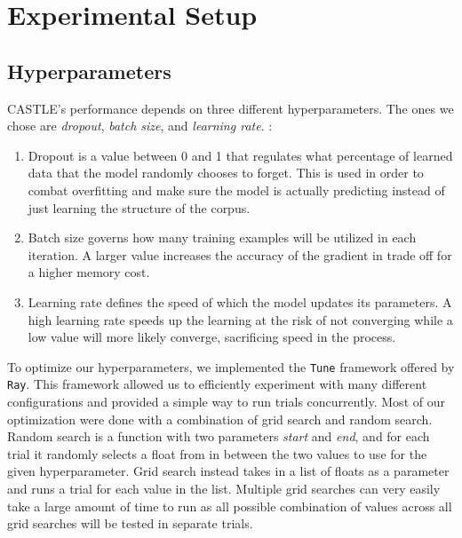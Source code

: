 \documentclass[nofilelist]{cslthse-msc}
\begin{document}








\section{Experimental Setup}

\subsection{Hyperparameters}
CASTLE's performance depends on three different hyperparameters. The ones we chose are \textit{dropout}, \textit{batch size}, and \textit{learning rate}. \citep{hyperparameters}:
\begin{enumerate}
    \item Dropout is a value between 0 and 1 that regulates what percentage of learned data that the model randomly chooses to forget. This is used in order to combat overfitting and make sure the model is actually predicting instead of just learning the structure of the corpus.
    \item  Batch size governs how many training examples will be utilized in each iteration. A larger value increases the accuracy of the gradient in trade off for a higher memory cost.
    \item  Learning rate defines the speed of which the model updates its parameters. A high learning rate speeds up the learning at the risk of not converging while a low value will more likely converge, sacrificing speed in the process.
\end{enumerate}

To optimize our hyperparameters, we implemented the \texttt{Tune} framework offered by \texttt{Ray}. This framework allowed us to efficiently experiment with many different configurations and provided a simple way to run trials concurrently. Most of our optimization were done with a combination of grid search and random search. Random search is a function with two parameters \textit{start} and \textit{end}, and for each trial it randomly selects a float from in between the two values to use for the given hyperparameter. Grid search instead takes in a list of floats as a parameter and runs a trial for each value in the list. Multiple grid searches can very easily take a large amount of time to run as all possible combination of values across all grid searches will be tested in separate trials. 
\end{document}

